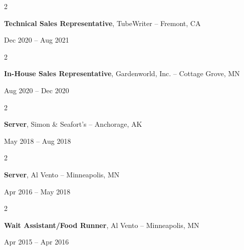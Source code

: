 \documentclass[10pt, letterpaper]{article}
\newenvironment{twocolentry}[2][]{
    \onecolentry
    \def\secondColumn{#2}
    \setcolumnwidth{\fill, 4.5 cm}
    \begin{paracol}{2}
}{
    \switchcolumn \raggedleft \secondColumn
    \end{paracol}
    \endonecolentry
} %
\begin{document}
        \begin{samepage} 
            \begin{twocolentry}{
                Dec 2020 – Aug 2021
                }
                \textbf{Technical Sales Representative}, TubeWriter -- Fremont, CA
            \end{twocolentry}
        \end{samepage}  


        \vspace{0.2 cm}


        \begin{samepage} 
            \begin{twocolentry}{
                Aug 2020 – Dec 2020
                }
                \textbf{In-House Sales Representative}, Gardenworld, Inc. -- Cottage Grove, MN
            \end{twocolentry}
        \end{samepage}  


        \vspace{0.2 cm}


        \begin{samepage} 
            \begin{twocolentry}{
                May 2018 – Aug 2018
                }
                \textbf{Server}, Simon \& Seafort's -- Anchorage, AK
            \end{twocolentry}
        \end{samepage}  


        \vspace{0.2 cm}


        \begin{samepage} 
            \begin{twocolentry}{
                Apr 2016 – May 2018
                }
                \textbf{Server}, Al Vento -- Minneapolis, MN
            \end{twocolentry}
        \end{samepage}  


        \vspace{0.2 cm}


        \begin{samepage} 
            \begin{twocolentry}{
                Apr 2015 – Apr 2016
                }
                \textbf{Wait Assistant/Food Runner}, Al Vento -- Minneapolis, MN
            \end{twocolentry}
        \end{samepage}  
\end{document}
